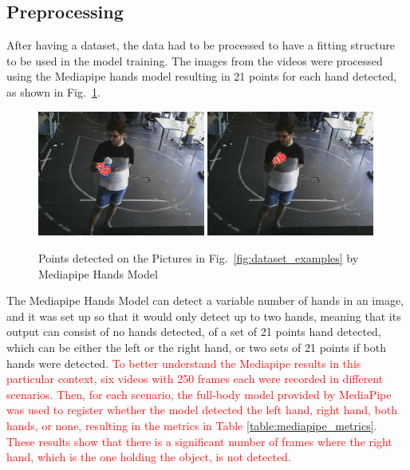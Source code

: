 \subsection{Preprocessing}

After having a dataset, the data had to be processed to have a fitting structure to be used in the model training. The images from the videos were processed using the Mediapipe hands model resulting in 21 points for each hand detected, as shown in Fig.~\ref{fig:dataset_examples2}.

\begin{figure}[H]
    \centerline{\includegraphics[width=0.49\textwidth]{figs/dataset_preprocessing2_1.png} \includegraphics[width=0.49\textwidth]{figs/dataset_preprocessing2_2.png}}
    \caption[Points detected on the Pictures in Fig.~\ref{fig:dataset_examples} by Mediapipe Hands Model]{Points detected on the Pictures in Fig.~\ref{fig:dataset_examples} by Mediapipe Hands Model}
    \label{fig:dataset_examples2}
\end{figure}

The Mediapipe Hands Model can detect a variable number of hands in an image, and it was set up so that it would only detect up to two hands, meaning that its output can consist of no hands detected, of a set of 21 points hand detected, which can be either the left or the right hand, or two sets of 21 points if both hands were detected. \textcolor{red}{To better understand the Mediapipe results in this particular context, six videos with 250 frames each were recorded in different scenarios. Then, for each scenario, the full-body model provided by MediaPipe was used to register whether the model detected the left hand, right hand, both hands, or none, resulting in the metrics in Table \ref{table:mediapipe_metrics}. These results show that there is a significant number of frames where the right hand, which is the one holding the object, is not detected.}

